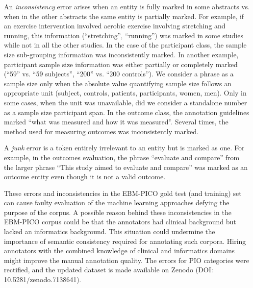 \documentclass[10.7pt,]{article}
\begin{document}
An \textit{inconsistency} error arises when an entity is fully marked in some abstracts vs. when in the other abstracts the same entity is partially marked. 
For example, if an exercise intervention involved aerobic exercise involving stretching and running, this information (``stretching'', ``running'') was marked in some studies while not in all the other studies.
In the case of the participant class, the sample size sub-grouping information was inconsistently marked.
In another example, participant sample size information was either partially or completely marked (``59'' vs. ``59 subjects'', ``200'' vs. ``200 controls'').
We consider a phrase as a sample size only when the absolute value quantifying sample size follows an appropriate unit (subject, controls, patients, participants, women, men). 
Only in some cases, when the unit was unavailable, did we consider a standalone number as a sample size participant span.
In the outcome class, the annotation guidelines marked ``what was measured and how it was measured''. 
Several times, the method used for measuring outcomes was inconsistently marked.



A \textit{junk} error is a token entirely irrelevant to an entity but is marked as one.
For example, in the outcomes evaluation, the phrase ``evaluate and compare'' from the larger phrase ``This study aimed to evaluate and compare'' was marked as an outcome entity even though it is not a valid outcome.



These errors and inconsistencies in the EBM-PICO gold test (and training) set can cause faulty evaluation of the machine learning approaches defying the purpose of the corpus.
A possible reason behind these inconsistencies in the EBM-PICO corpus could be that the annotators had clinical background but lacked an informatics background.
This situation could undermine the importance of semantic consistency required for annotating such corpora.
Hiring annotators with the combined knowledge of clinical and informatics domains might improve the manual annotation quality.
The errors for PIO categories were rectified, and the updated dataset is made available on Zenodo (DOI: 10.5281/zenodo.7138641).
%
\end{document}
